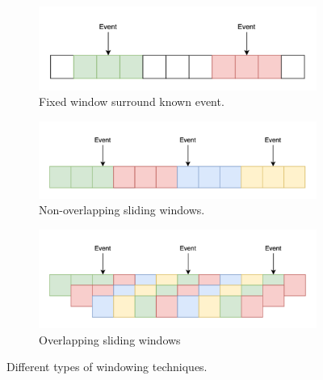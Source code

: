 \begin{figure}[ht]
    \centering
    \begin{subfigure}{0.45\textwidth}
        \centering
        \includegraphics[width=\textwidth]{../images/pipeline/fixed_window.pdf}
        \captionsetup{width=\linewidth}
        \captionsetup{justification=centering}
        \caption{Fixed window surround known event.}
        \label{fig:processing_signals_windowing_non_fixed}
    \end{subfigure}
    \hfill
    \begin{subfigure}{0.45\textwidth}
        \centering
        \includegraphics[width=\textwidth]{../images/pipeline/non_overlapping_window.pdf}
        \captionsetup{width=\linewidth}
        \captionsetup{justification=centering}
        \caption{Non-overlapping sliding windows.}
        \label{fig:processing_signals_windowing_non_overlapping}
    \end{subfigure}
    \hfill
    \begin{subfigure}{0.45\textwidth}
        \centering
        \includegraphics[width=\textwidth]{../images/pipeline/overlapping_window.pdf}
        \captionsetup{width=\linewidth}
        \captionsetup{justification=centering}
        \caption{Overlapping sliding windows}
        \label{fig:processing_signals_windowing_overlapping}
    \end{subfigure}
    \captionsetup{width=\linewidth}
    \captionsetup{justification=centering}
    \caption{Different types of windowing techniques.}
    \label{fig:processing_signals_windowing}
\end{figure}


